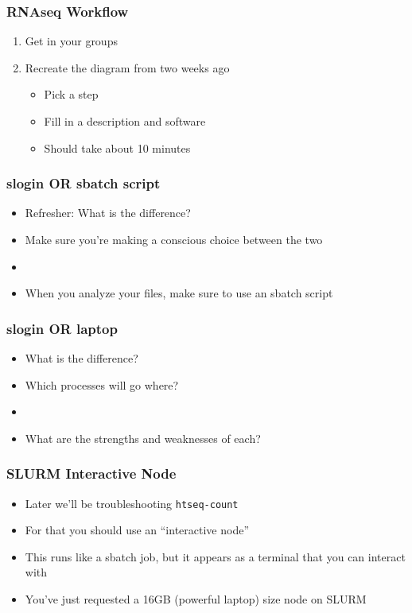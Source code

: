 \documentclass[14pt,handout]{beamer}
\begin{document}
\begin{frame}
\frametitle{RNAseq Workflow}
\begin{enumerate}
	\large
	\item<+-> Get in your groups
	\item<+-> Recreate the diagram from two weeks ago
	\begin{itemize}
		\item<+-> Pick a step
		\item<+-> Fill in a description and software
		\item<+-> Should take about 10 minutes
	\end{itemize}
\end{enumerate}
\end{frame}

\begin{frame}
\frametitle{slogin OR sbatch script}
\begin{itemize}
	\large
	\item<+-> Refresher: What is the difference?
	\item<+-> Make sure you're making a conscious choice between the two
	\item[] 
	\item<+-> When you analyze your files, make sure to use an sbatch script
\end{itemize}
\end{frame}

\begin{frame}
\frametitle{slogin OR laptop}
\begin{itemize}
	\large
	\item<+-> What is the difference?
	\item<+-> Which processes will go where?
	\item[]
	\item<+-> What are the strengths and weaknesses of each?
\end{itemize}
\end{frame}

\begin{frame}
\frametitle{SLURM Interactive Node}
\begin{itemize}
	\item Later we'll be troubleshooting \texttt{htseq-count}
	\item For that you should use an ``interactive node''
	\item This runs like a sbatch job, but it appears as a terminal that you can interact with
	\footnotesize
	\ttfamily
	\sffamily
	\item You've just requested a 16GB (powerful laptop) size node on SLURM
\end{itemize}
\end{frame}
\end{document}
